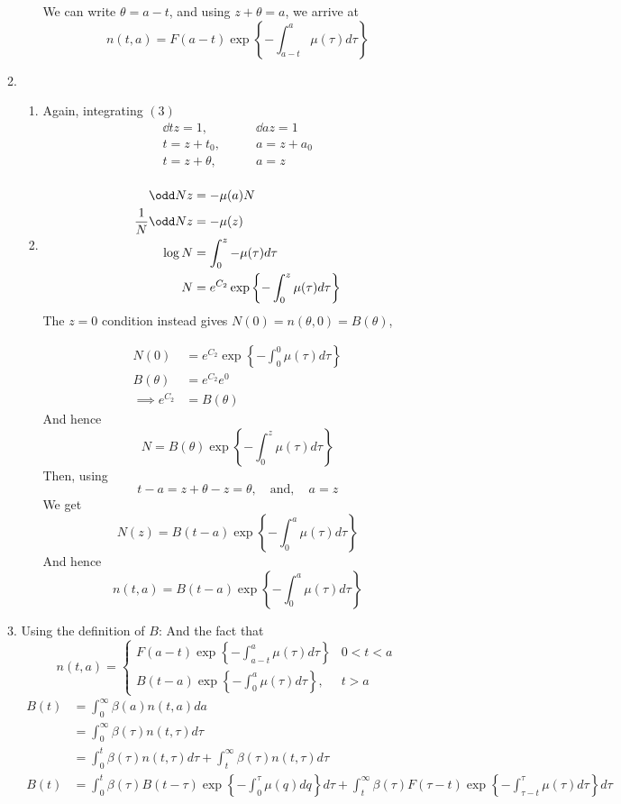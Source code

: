 \documentclass{X:/Documents/Coding/Latex/myassignment}
\begin{document}
\begin{enumerate}
\begin{enumerate}
\begin{enumerate}
			We can write $\theta = a-t$, and using $z+\theta = a$, we arrive at
			\[n(t,a) = F(a-t) \exp\left\{-\int_{a-t}^a \mu(\tau) d \tau\right\}\]

		\end{enumerate}

		\item 
		\begin{enumerate}
			\item Again, integrating $(3)$
			\begin{align*}
				\dd tz = 1,& \qquad \dd az =1\\
				t = z + t_0,&\qquad a = z + a_0\\
				t = z + \theta,& \qquad a = z\\
			\end{align*}
			\item 
			\begin{align*}
				\odd Nz &= - \mu(a) N\\
				\frac1N \odd Nz &= - \mu(z)\\
				\log N &= \int_0^z -\mu(\tau) d \tau\\
				N &= e^{C_2} \exp\left\{-\int_0^{z} \mu(\tau) d \tau\right\}
			\end{align*}
			The $z=0$ condition instead gives $N(0) = n(\theta,0) = B(\theta)$, 

			\begin{align*}
				N(0) &= e^{C_2} \exp\left\{-\int_0^{0} \mu(\tau) d \tau\right\}\\
				B(\theta) &= e^{C_2} e^0\\
				\implies e^{C_2} &= B(\theta)
			\end{align*}
			And hence
			\[N = B(\theta) \exp\left\{-\int_0^{z} \mu(\tau) d \tau\right\}\]
			Then, using 
			\[t-a = z+\theta - z = \theta, \quad \text{and}, \quad a = z\]
			We get
			\[N(z) = B(t-a) \exp \left\{-\int_{0}^a \mu(\tau) d \tau\right\}\]
			And hence
			\[n(t,a) = B(t-a) \exp\left\{-\int_{0}^a \mu(\tau) d \tau\right\}\]

		\end{enumerate}
		\item Using the definition of $B$:
		And the fact that
		\[n(t,a) = \begin{cases}
			F(a-t) \exp\left\{-\int_{a-t}^a \mu(\tau) d \tau\right\} & 0<t < a\\
			B(t-a) \exp\left\{-\int_{0}^a \mu(\tau) d \tau\right\}, & t> a	
		\end{cases}\]
		\begin{align*}
			B(t) &= \int_0^\infty \beta(a) n(t,a) da\\
			&= \int_0^\infty \beta(\tau) n(t,\tau) d \tau\\
			&= \int_0^t \beta(\tau) n(t,\tau) d \tau + \int_t^\infty \beta(\tau) n(t,\tau) d \tau\\
			B(t) &= \int_0^t \beta(\tau) B(t- \tau) \exp\left\{-\int_{0}^\tau \mu(q) d q\right\} d \tau + \int_t^\infty  \beta(\tau)F(\tau-t) \exp\left\{-\int_{\tau - t}^\tau \mu(\tau) d \tau\right\}  d \tau \\
		\end{align*}
	\end{enumerate}


\end{enumerate}
\end{document}
